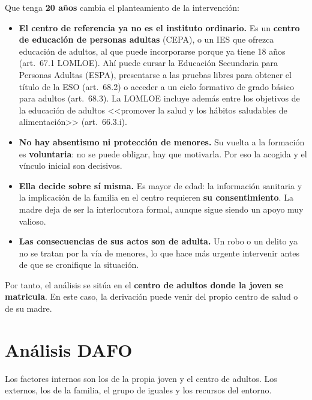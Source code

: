 \documentclass[11pt,a4paper]{article}
\begin{document}
Que tenga \textbf{20 años} cambia el planteamiento de la intervención:
\begin{itemize}
  \item \textbf{El centro de referencia ya no es el instituto ordinario.} Es un
  \textbf{centro de educación de personas adultas} (CEPA), o un IES que ofrezca
  educación de adultos, al que puede incorporarse porque ya tiene 18 años
  (art.~67.1 LOMLOE). Ahí puede cursar la Educación Secundaria para Personas
  Adultas (ESPA), presentarse a las pruebas libres para obtener el título de
  la ESO (art.~68.2) o acceder a un ciclo formativo de grado básico para
  adultos (art.~68.3). La LOMLOE incluye además entre los objetivos de la
  educación de adultos <<promover la salud y los hábitos saludables de
  alimentación>> (art.~66.3.i).
  \item \textbf{No hay absentismo ni protección de menores.} Su vuelta a la
  formación es \textbf{voluntaria}: no se puede obligar, hay que motivarla.
  Por eso la acogida y el vínculo inicial son decisivos.
  \item \textbf{Ella decide sobre sí misma.} Es mayor de edad: la información
  sanitaria y la implicación de la familia en el centro requieren \textbf{su
  consentimiento}. La madre deja de ser la interlocutora formal, aunque sigue
  siendo un apoyo muy valioso.
  \item \textbf{Las consecuencias de sus actos son de adulta.} Un robo o un
  delito ya no se tratan por la vía de menores, lo que hace más urgente
  intervenir antes de que se cronifique la situación.
\end{itemize}

Por tanto, el análisis se sitúa en el \textbf{centro de adultos donde la joven
se matricula}. En este caso, la derivación puede venir del propio centro de
salud o de su madre.

\section{Análisis DAFO}
Los factores internos son los de la propia joven y el centro de adultos. Los
externos, los de la familia, el grupo de iguales y los recursos del entorno.
\end{document}
